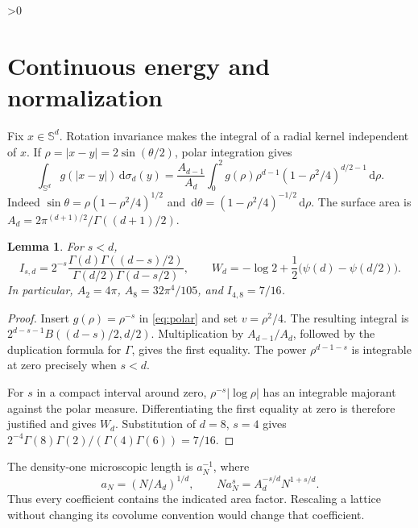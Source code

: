 \documentclass[11pt,a4paper]{article}
\newtheorem{lemma}[theorem]{Lemma}
\theoremstyle{definition}
\newcommand{\Sph}{\mathbb S}
\newcommand{\dd}{\,\mathrm d}
\newcommand{\abs}[1]{\lvert#1\rvert}
\numberwithin{equation}{section}
\let\originalsection\section
\renewcommand{\section}{\ifnum\value{section}>0\clearpage\fi\originalsection}
\begin{document}
\section{Continuous energy and normalization}\label{sec:continuous}
Fix $x\in\Sph^d$. Rotation invariance makes the integral of a radial kernel independent of $x$. If $\rho=\abs{x-y}=2\sin(\theta/2)$, polar integration gives
\begin{equation}\label{eq:polar}
 \int_{\Sph^d}g(\abs{x-y})\dd\sigma_d(y)
 =\frac{A_{d-1}}{A_d}\int_0^2g(\rho)\rho^{d-1}
             (1-\rho^2/4)^{d/2-1}\dd\rho.
\end{equation}
Indeed $\sin\theta=\rho(1-\rho^2/4)^{1/2}$ and $\dd\theta=(1-\rho^2/4)^{-1/2}\dd\rho$. The surface area is $A_d=2\pi^{(d+1)/2}/\Gamma((d+1)/2)$.

\begin{lemma}\label{lem:continuous}
For $s<d$,
\begin{equation}\label{eq:beta}
 I_{s,d}=2^{-s}\frac{\Gamma(d)\Gamma((d-s)/2)}
                         {\Gamma(d/2)\Gamma(d-s/2)},\qquad
 W_d=-\log2+\frac12\bigl(\psi(d)-\psi(d/2)\bigr).
\end{equation}
In particular, $A_2=4\pi$, $A_8=32\pi^4/105$, and $I_{4,8}=7/16$.
\end{lemma}
\begin{proof}
Insert $g(\rho)=\rho^{-s}$ in \eqref{eq:polar} and set $v=\rho^2/4$. The resulting integral is
$2^{d-s-1}B((d-s)/2,d/2)$. Multiplication by $A_{d-1}/A_d$, followed by the duplication formula for $\Gamma$, gives the first equality. The power $\rho^{d-1-s}$ is integrable at zero precisely when $s<d$.

For $s$ in a compact interval around zero, $\rho^{-s}\abs{\log\rho}$ has an integrable majorant against the polar measure. Differentiating the first equality at zero is therefore justified and gives $W_d$. Substitution of $d=8$, $s=4$ gives $2^{-4}\Gamma(8)\Gamma(2)/(\Gamma(4)\Gamma(6))=7/16$.
\end{proof}
The density-one microscopic length is $a_N^{-1}$, where
\begin{equation}\label{eq:density}
 a_N=(N/A_d)^{1/d},\qquad Na_N^s=A_d^{-s/d}N^{1+s/d}.
\end{equation}
Thus every coefficient contains the indicated area factor. Rescaling a lattice without changing its covolume convention would change that coefficient.
\end{document}
